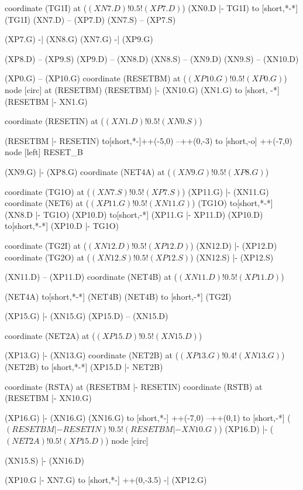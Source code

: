 \begin{circuitikz}[american]
	coordinate (TG1I) at ($(XN7.D)!0.5!(XP7.D)$)
	(XN0.D |- TG1I) to [short,*-*] (TG1I)
	(XN7.D) -- (XP7.D)
	(XN7.S) -- (XP7.S)
	
	(XP7.G) -| (XN8.G)
	(XN7.G)  -| (XP9.G)
	
	(XP8.D) -- (XP9.S)
	(XP9.D) -- (XN8.D)
	(XN8.S) -- (XN9.D)
	(XN9.S) -- (XN10.D)
	
	(XP0.G) -- (XP10.G)
	coordinate (RESETBM) at ($(XP10.G)!0.5!(XP0.G)$)%
	node [circ] at (RESETBM){}
	(RESETBM) |- (XN10.G)
	(XN1.G) to [short, -*] (RESETBM |- XN1.G)%
	
	
	coordinate (RESETIN) at ($(XN1.D)!0.5!(XN0.S)$)
	
	(RESETBM |- RESETIN) to[short,*-]++(-5,0) --++(0,-3) to [short,-o] ++(-7,0) node [left] {RESET\_B}
	
	(XN9.G) |- (XP8.G)
	coordinate (NET4A) at ($(XN9.G)!0.5!(XP8.G)$)%
	
	
	coordinate (TG1O) at ($(XN7.S)!0.5!(XP7.S)$)
	(XP11.G) |- (XN11.G) 
	coordinate (NET6) at ($(XP11.G)!0.5!(XN11.G)$)
	(TG1O) to[short,*-*] (XN8.D |- TG1O) 
	(XP10.D) to[short,-*] (XP11.G |- XP11.D)
	(XP10.D) to[short,*-*] (XP10.D |- TG1O)
	
	
	coordinate (TG2I) at ($(XN12.D)!0.5!(XP12.D)$)
	(XN12.D) |- (XP12.D)
	coordinate (TG2O) at ($(XN12.S)!0.5!(XP12.S)$)
	(XN12.S) |- (XP12.S)	
	
	(XN11.D) -- (XP11.D)
	coordinate (NET4B) at ($(XN11.D)!0.5!(XP11.D)$) 
	
	(NET4A) to[short,*-*] (NET4B)
	(NET4B) to [short,-*] (TG2I)
	
	
	(XP15.G) |- (XN15.G)
	(XP15.D) -- (XN15.D)
	
	coordinate (NET2A) at ($(XP15.D)!0.5!(XN15.D)$) 
	
	
	(XP13.G) |- (XN13.G)
	coordinate (NET2B) at ($(XP13.G)!0.4!(XN13.G)$) 
	(NET2B) to [short,*-*] (XP15.D |- NET2B)%
	
	coordinate (RSTA) at (RESETBM |- RESETIN)	
	coordinate (RSTB) at (RESETBM |- XN10.G)
	
	(XP16.G) |- (XN16.G)
	(XN16.G) to [short,*-] ++(-7,0) --++(0,1) to [short,-*]
	($(RESETBM |- RESETIN)!0.5!(RESETBM |- XN10.G)$) 
	(XP16.D) |- ($(NET2A)!0.5!(XP15.D)$) node [circ] {}
	
	
	(XN15.S) |- (XN16.D)
	
	
	(XP10.G |- XN7.G) to [short,*-] ++(0,-3.5) -| (XP12.G)
	

\end{circuitikz}
